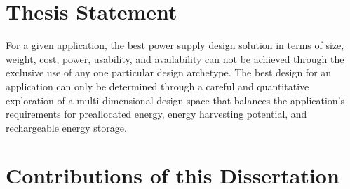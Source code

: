 \section{Thesis Statement}

%
%
%
%
%
%


For a given application, the best power supply design solution in terms of size, weight, cost, power, usability, and availability can not be achieved through the exclusive use of any one particular design archetype. The best design for an application can only be determined through a careful and quantitative exploration of a multi-dimensional design space that balances the application's requirements for preallocated energy, energy harvesting potential, and rechargeable energy storage. 

\the\textwidth
\the\columnwidth

\section{Contributions of this Dissertation}


